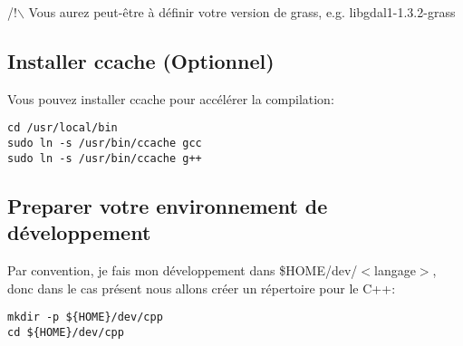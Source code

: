/!$\backslash$ Vous aurez peut-être à définir votre version de grass, e.g. libgdal1-1.3.2-grass

\subsection{Installer ccache (Optionnel)}
Vous pouvez installer ccache pour accélérer la compilation:

\begin{verbatim}
cd /usr/local/bin 
sudo ln -s /usr/bin/ccache gcc 
sudo ln -s /usr/bin/ccache g++ 
\end{verbatim}


\subsection{Preparer votre environnement de développement}
Par convention, je fais mon développement dans \$HOME/dev/$<$langage$>$, donc dans le cas présent nous allons créer un répertoire pour le C++:

\begin{verbatim}
mkdir -p ${HOME}/dev/cpp 
cd ${HOME}/dev/cpp 
\end{verbatim}

% 
% 
% 

